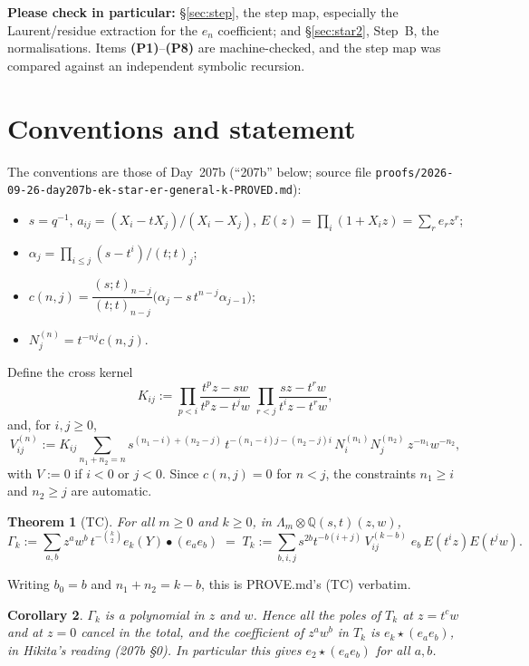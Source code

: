 \documentclass[11pt]{amsart}
\newtheorem{theorem}{Theorem}
\newtheorem{corollary}[theorem]{Corollary}
\theoremstyle{remark}
\newcommand{\poch}[2]{(#1;t)_{#2}}
\newcommand{\plab}[1]{\textbf{(#1)}}
\begin{document}
\medskip
\noindent\textbf{Please check in particular:} \S\ref{sec:step}, the step map, especially the Laurent/residue extraction for the $e_n$ coefficient; and \S\ref{sec:star2}, Step~B, the normalisations. Items \plab{P1}--\plab{P8} are machine-checked, and the step map was compared against an independent symbolic recursion.

\section{Conventions and statement}\label{sec:statement}

The conventions are those of Day~207b (``207b'' below; source file
{\footnotesize\texttt{proofs/2026-09-26-day207b-ek-star-er-general-k-PROVED.md}}):
\begin{itemize}
\item $s=q^{-1}$, $a_{ij}=(X_i-tX_j)/(X_i-X_j)$, $E(z)=\prod_i(1+X_iz)=\sum_r e_rz^r$;
\item $\alpha_j=\prod_{i\le j}(s-t^i)/\poch tj$;
\item $c(n,j)=\dfrac{\poch s{n-j}}{\poch t{n-j}}\bigl(\alpha_j-s\,t^{n-j}\alpha_{j-1}\bigr)$;
\item $N^{(n)}_j=t^{-nj}c(n,j)$.
\end{itemize}
Define the cross kernel
\[
K_{ij}:=\prod_{p<i}\frac{t^pz-sw}{t^pz-t^jw}\;\prod_{r<j}\frac{sz-t^rw}{t^iz-t^rw},
\]
and, for $i,j\ge0$,
\[
V^{(n)}_{ij}:=K_{ij}\sum_{n_1+n_2=n}s^{(n_1-i)+(n_2-j)}\,t^{-(n_1-i)j-(n_2-j)i}\,N^{(n_1)}_iN^{(n_2)}_j\,z^{-n_1}w^{-n_2},
\]
with $V:=0$ if $i<0$ or $j<0$. Since $c(n,j)=0$ for $n<j$, the constraints $n_1\ge i$ and $n_2\ge j$ are automatic.

\begin{theorem}[TC]\label{thm:TC}
For all $m\ge0$ and $k\ge0$, in $\Lambda_m\otimes\mathbb{Q}(s,t)(z,w)$,
\[
\Gamma_k:=\sum_{a,b}z^aw^b\,t^{-\binom k2}e_k(Y)\bullet(e_ae_b)
\;=\;T_k:=\sum_{b,i,j}s^{2b}t^{-b(i+j)}\,V^{(k-b)}_{ij}\;e_b\,E(t^iz)E(t^jw).
\]
\end{theorem}
Writing $b_0=b$ and $n_1+n_2=k-b$, this is PROVE.md's (TC) verbatim.

\begin{corollary}
$\Gamma_k$ is a polynomial in $z$ and $w$. Hence all the poles of $T_k$ at $z=t^cw$ and at $z=0$ cancel in the total, and the coefficient of $z^aw^b$ in $T_k$ is $e_k\star(e_ae_b)$, in Hikita's reading (207b \S0). In particular this gives $e_2\star(e_ae_b)$ for all $a,b$.
\end{corollary}
\end{document}
